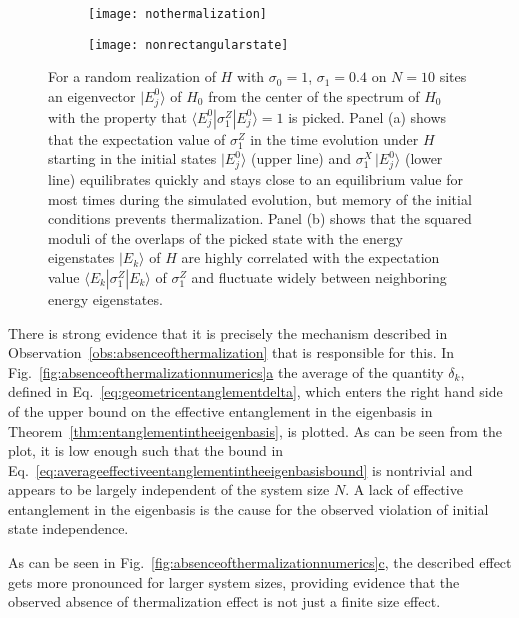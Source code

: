 \documentclass[a4paper,12pt,listof=totoc,index=totoc,bibliography=totoc,headsepline=false,headings=normal,BCOR16.153846mm,DIV12,headinclude,twoside,cleardoublepage=empty,numbers=noenddot,final]{scrreprt}
\newcommand{\refsub}[2]{\hyperref[#1]{\ref*{#1}#2}}
\theoremstyle{mystyle}
\numberwithin{equation}{section}
\numberwithin{figure}{section}
\numberwithin{lemma}{section}
\numberwithin{theorem}{section}
\numberwithin{corollary}{section}
\numberwithin{definition}{section}
\numberwithin{conjecture}{section}
\numberwithin{observation}{section}
\newcommand{\+}{\mkern2mu}
\newcommand{\texteqref}[1]{Eq.~\eqref{#1}}
\renewcommand{\H}{H}
\newcommand{\bra}[1]{\langle #1|}
\newcommand{\ket}[1]{|#1\rangle}
\DeclareMathOperator{\1}{\mathds{1}}
\begin{document}
\begin{figure}[bt]
  \centering
  \begin{subfigure}{0.45\textwidth}
    \texttt{[image: nothermalization]}
    \caption{}
    \label{fig:absenceofthermalizationnumerics2a}
  \end{subfigure}
  \begin{subfigure}{0.45\textwidth}
    \texttt{[image: nonrectangularstate]}
    \caption{}
    \label{fig:absenceofthermalizationnumerics2b}
  \end{subfigure}
  \caption{For a random realization of $\H$ with $\sigma_0 = 1$, $\sigma_1 = 0.4$ on $N=10$ sites an eigenvector $\ket{E^0_j}$ of $\H_0$ from the center of the spectrum of $\H_0$ with the property that $\bra{E^0_j} \sigma^Z_1 \ket{E_j^0} = 1$ is picked.
    Panel (a) shows that the expectation value of $\sigma^Z_1$ in the time evolution under $\H$ starting in the initial states $\ket{E^0_j}$ (upper line) and $\sigma^X_1\,\ket{E^0_j}$ (lower line) equilibrates quickly and stays close to an equilibrium value for most times during the simulated evolution, but memory of the initial conditions prevents thermalization.
    Panel (b) shows that the squared moduli of the overlaps of the picked state with the energy eigenstates $\ket{E_k}$ of $\H$ are highly correlated with the expectation value $\bra{E_k}\sigma^Z_1\ket{E_k}$ of $\sigma^Z_1$ and fluctuate widely between neighboring energy eigenstates.
  }
  \label{fig:absenceofthermalizationnumerics2}
\end{figure}

There is strong evidence that it is precisely the mechanism described in Observation~\ref{obs:absenceofthermalization} that is responsible for this.
In Fig.~\refsub{fig:absenceofthermalizationnumerics}{a} the average of the quantity $\delta_k$, defined in \texteqref{eq:geometricentanglementdelta}, which enters the right hand side of the upper bound on the effective entanglement in the eigenbasis in Theorem~\ref{thm:entanglementintheeigenbasis}, is plotted.
As can be seen from the plot, it is low enough such that the bound in \texteqref{eq:averageeffectiveentanglementintheeigenbasisbound} is nontrivial and appears to be largely independent of the system size $N$.
A lack of effective entanglement in the eigenbasis is the cause for the observed violation of initial state independence.

As can be seen in Fig.~\refsub{fig:absenceofthermalizationnumerics}{c}, the described effect gets more pronounced for larger system sizes, providing evidence that the observed absence of thermalization effect is not just a finite size effect.
\end{document}
